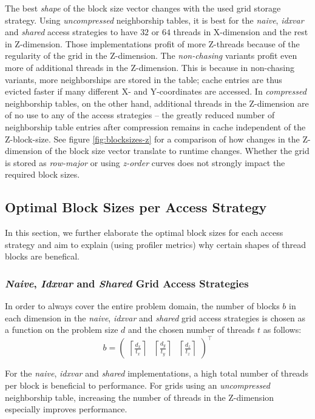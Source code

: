 The best \emph{shape} of the block size vector changes with the used grid storage strategy. Using \emph{uncompressed} neighborship tables, it is best for the \emph{naive}, \emph{idxvar} and \emph{shared} access strategies to have $32$ or $64$ threads in X-dimension and the rest in Z-dimension. Those implementations profit of more Z-threads because of the regularity of the grid in the Z-dimension. The \emph{non-chasing} variants profit even more of additional threads in the Z-dimension. This is because in non-chasing variants, more neighborships are stored in the table; cache entries are thus evicted faster if many different X- and Y-coordinates are accessed. In \emph{compressed} neighborship tables, on the other hand, additional threads in the Z-dimension are of no use to any of the access strategies -- the greatly reduced number of neighborship table entries after compression remains in cache independent of the Z-block-size. See figure \ref{fig:blocksizes-z} for a comparison of how changes in the Z-dimension of the block size vector translate to runtime changes. Whether the grid is stored as \emph{row-major} or using \emph{z-order} curves does not strongly impact the required block sizes.

\subsection{Optimal Block Sizes per Access Strategy}

In this section, we further elaborate the optimal block sizes for each access strategy and aim to explain (using profiler metrics) why certain shapes of thread blocks are benefical.

\subsubsection{\emph{Naive}, \emph{Idxvar} and \emph{Shared} Grid Access Strategies}

In order to always cover the entire problem domain, the number of blocks $b$ in each dimension in the \emph{naive}, \emph{idxvar} and \emph{shared} grid access strategies is chosen as a function on the problem size $d$ and the chosen number of threads $t$ as follows:
$$b = \begin{pmatrix}\left\lceil\frac{d_x}{t_x}\right\rceil & \left\lceil\frac{d_y}{t_y}\right\rceil & \left\lceil\frac{d_z}{t_z}\right\rceil\end{pmatrix}^\top$$

For the \emph{naive}, \emph{idxvar} and \emph{shared} implementations, a high total number of threads per block is beneficial to performance. For grids using an \emph{uncompressed} neighborship table, increasing the number of threads in the Z-dimension especially improves performance.

